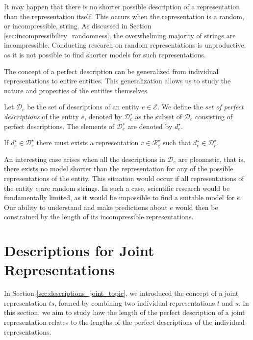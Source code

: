 It may happen that there is no shorter possible description of a representation than the representation itself. This occurs when the representation is a random, or incompressible, string. As discussed in Section \ref{sec:incompressibility_randomness}, the overwhelming majority of strings are incompressible. Conducting research on random representations is unproductive, as it is not possible to find shorter models for such representations.

The concept of a perfect description can be generalized from individual representations to entire entities. This generalization allows us to study the nature and properties of the entities themselves.

\begin{definition}
\label{def:entities_perfect_model}
Let $\mathcal{D}_e$ be the set of descriptions of an entity $e \in \mathcal{E}$. We define the \emph{set of perfect descriptions} of the entity $e$, denoted by $\mathcal{D}^\star_e$ as the subset of $\mathcal{D}_e$ consisting of perfect descriptions. The elements of $\mathcal{D}^\star_e$ are denoted by $d^\star_e$.
\end{definition}

If $d^\star_e \in \mathcal{D}^\star_e$ there must exists a representation $r \in \mathcal{R}^\star_e$ such that $d^\star_e \in \mathcal{D}^\star_r$.

An interesting case arises when all the descriptions in $\mathcal{D}_e$ are pleonastic, that is, there exists no model shorter than the representation for any of the possible representations of the entity. This situation would occur if all representations of the entity $e$ are random strings. In such a case, scientific research would be fundamentally limited, as it would be impossible to find a suitable model for $e$. Our ability to understand and make predictions about $e$ would then be constrained by the length of its incompressible representations.

%
%

\section{Descriptions for Joint Representations}
\label{sec:description_joint_represenation}

In Section \ref{sec:descriptions_joint_topic}, we introduced the concept of a joint representation $ts$, formed by combining two individual representations $t$ and $s$. In this section, we aim to study how the length of the perfect description of a joint representation relates to the lengths of the perfect descriptions of the individual representations.

